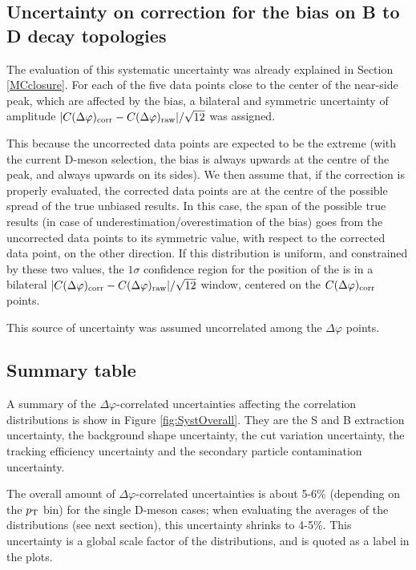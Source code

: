 \subsection{Uncertainty on correction for the bias on B to D decay topologies}
The evaluation of this systematic uncertainty was already explained in Section \ref{MCclosure}. For each of the five data points close to the center of the near-side peak, which are affected by the bias, a bilateral and symmetric uncertainty of amplitude $|C(\Delta\varphi)_{\rm corr} - C(\Delta\varphi)_{\rm raw}|/\sqrt{12}$ was assigned.

This because the uncorrected data points are expected to be the extreme (with the current D-meson selection, the bias is always upwards at the centre of the peak, and always upwards on its sides). We then assume that, if the correction is properly evaluated, the corrected data points are at the centre of the possible spread of the true unbiased results. In this case, the span of the possible true results (in case of underestimation/overestimation of the bias) goes from the uncorrected data points to its symmetric value, with respect to the corrected data point, on the other direction. If this distribution is uniform, and constrained by these two values, the $1\sigma$ confidence region for the position of the is in a bilateral $|C(\Delta\varphi)_{\rm corr} - C(\Delta\varphi)_{\rm raw}|/\sqrt{12}$ window, centered on the $C(\Delta\varphi)_{\rm corr}$ points.

This source of uncertainty was assumed uncorrelated among the $\Delta\varphi$ points.

\subsection{Summary table}
A summary of the $\Delta\varphi$-correlated uncertainties affecting the correlation distributions is show in Figure \ref{fig:SystOverall}. They are the S and B extraction uncertainty, the background shape uncertainty, the cut variation uncertainty, the tracking efficiency uncertainty and the secondary particle contamination uncertainty.

The overall amount of $\Delta\varphi$-correlated uncertainties is about 5-6\% (depending on the $p_{\rm T}$ bin) for the single D-meson cases; when evaluating the averages of the distributions (see next section), this uncertainty shrinks to 4-5\%. This uncertainty is a global scale factor of the distributions, and is quoted as a label in the plots.

